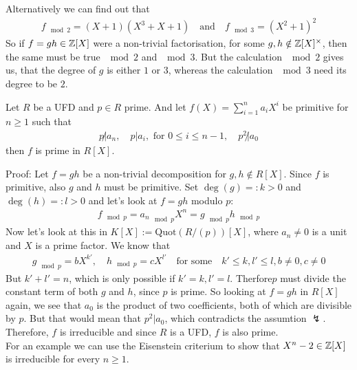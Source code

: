 Alternatively we can find out that
\begin{align*}
	f_{\mod 2} = (X + 1)(X^3 + X + 1) \quad \text{and} \quad f_{\mod 3} = (X^2 + 1)^2
\end{align*}
So if $f = gh \in \mathbb{Z}[X]$ were a non-trivial factorisation, for some $g,h \notin \mathbb{Z}[X]^{\times}$, then the same must be true $\mod 2$ and $\mod 3$.
But the calculation $\mod 2$ gives us, that the degree of $g$ is either $1$ or $3$, whereas the calculation $\mod 3$ need its degree to be $2$.


\begin{ntheorem}
	Let $R$ be a UFD and $p \in R$ prime. And let $f(X) = \sum_{i = 1}^{n}a_i X^i$ be primitive for $n \geq 1$ such that
	\begin{align*}
		p\not|a_n, \quad p|a_i, \text{ for } 0\leq i \leq n-1, \quad p^2\not| a_0
	\end{align*}
	then $f$ is prime in $R[X]$.
\end{ntheorem}
Proof: Let $f = gh$ be a non-trivial decomposition for $g,h \notin R[X]$. Since $f$ is primitive, also $g$ and $h$ must be primitive. Set $\deg(g) =: k > 0$ and $\deg(h) =: l > 0$ and let's look at $f = gh$ modulo $p$:
\begin{align*}
f_{\mod p} = {a_n}_{\mod p} X^n = g_{\mod p} h_{\mod p}
\end{align*}
Now let's look at this in $K[X] := \text{Quot}(R/(p))[X]$, where $a_n \neq 0$ is a unit and $X$ is a prime factor. We know that
\begin{align*}
	g_{\mod p} = bX^{k'}, \quad h_{\mod p} = c X^{l'} \quad \text{for some} \quad k' \leq k, l' \leq l, b\neq 0, c \neq 0
\end{align*}
But $k' + l' = n$, which is only possible if $k' = k, l' = l$. Therfore$p$ must divide the constant term of both $g$ and $h$, since $p$ is prime. So looking at $f = gh$ in $R[X]$ again, we see that $a_0$ is the product of two coefficients, both of which are divisible by $p$.
But that would mean that $p^2|a_0$, which contradicts the assumtion $\lightning$.
Therefore, $f$ is irreducible and since $R$ is a UFD, $f$ is also prime.\\


For an example we can use the Eisenstein criterium to show that $X^n - 2 \in \mathbb{Z}[X]$ is irreducible for every $n \geq 1$.

